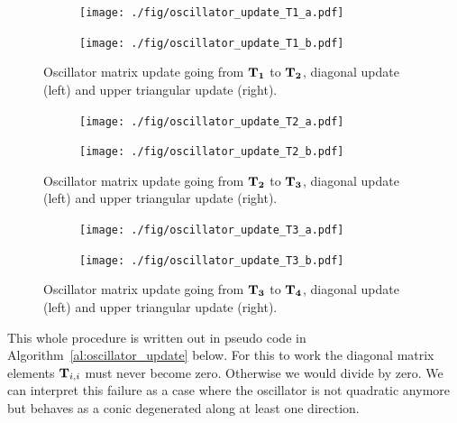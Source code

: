 \documentclass[a4paper,10pt]{article}
\begin{document}
\begin{figure}
  \begin{subfigure}[b]{0.5\linewidth}
    \texttt{[image: ./fig/oscillator\_update\_T1\_a.pdf]}
  \end{subfigure}
  \begin{subfigure}[b]{0.5\linewidth}
    \texttt{[image: ./fig/oscillator\_update\_T1\_b.pdf]}
  \end{subfigure}
  \caption{Oscillator matrix update going from $\mathbf{T_1}$ to $\mathbf{T_2}$,
  diagonal update (left) and upper triangular update (right).}
  \label{fig:oscillator_update_T1}
\end{figure}

\begin{figure}
  \begin{subfigure}[b]{0.5\linewidth}
    \texttt{[image: ./fig/oscillator\_update\_T2\_a.pdf]}
  \end{subfigure}
  \begin{subfigure}[b]{0.5\linewidth}
    \texttt{[image: ./fig/oscillator\_update\_T2\_b.pdf]}
  \end{subfigure}
  \caption{Oscillator matrix update going from $\mathbf{T_2}$ to $\mathbf{T_3}$,
  diagonal update (left) and upper triangular update (right).}
  \label{fig:oscillator_update_T2}
\end{figure}

\begin{figure}
  \begin{subfigure}[b]{0.5\linewidth}
    \texttt{[image: ./fig/oscillator\_update\_T3\_a.pdf]}
  \end{subfigure}
  \begin{subfigure}[b]{0.5\linewidth}
    \texttt{[image: ./fig/oscillator\_update\_T3\_b.pdf]}
  \end{subfigure}
  \caption{Oscillator matrix update going from $\mathbf{T_3}$ to $\mathbf{T_4}$,
  diagonal update (left) and upper triangular update (right).}
  \label{fig:oscillator_update_T3}
\end{figure}

This whole procedure is written out in pseudo code in
Algorithm~\ref{al:oscillator_update} below. For this to work the diagonal
matrix elements $\mathbf{T}_{i,i}$ must never become zero. Otherwise
we would divide by zero. We can interpret this failure as a
case where the oscillator is not quadratic anymore but behaves
as a conic degenerated along at least one direction.
\end{document}
